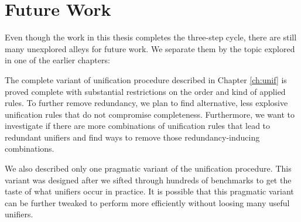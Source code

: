 


\section*{Future Work}

Even though the work in this thesis completes the three-step cycle, there are
still many unexplored alleys for future work. We separate them by the topic
explored in one of the earlier chapters:

 The complete variant of unification procedure
described in Chapter \ref{ch:unif} is proved complete with substantial
restrictions on the order and kind of applied rules. To further
remove redundancy, we plan to find alternative, less explosive unification rules
that do not compromise completeness. Furthermore, we want to investigate if
there are more combinations of unification rules that lead to redundant unifiers
and find ways to remove those redundancy-inducing combinations.

We also described only one pragmatic variant of the unification procedure. This
variant was designed after we sifted through hundreds of benchmarks to get the
taste of what unifiers occur in practice. It is possible that this pragmatic variant
can be further tweaked to perform more efficiently without loosing many useful unifiers.


